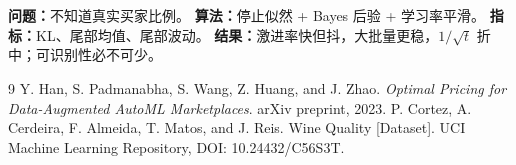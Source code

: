\documentclass[11pt,a4paper]{ctexart}
\begin{document}
\begin{tcolorbox}[colback=LightGreen,colframe=ZJUGreen,title=RQ3,fonttitle=\bfseries]
\textbf{问题：}不知道真实买家比例。\quad
\textbf{算法：}停止似然 + Bayes 后验 + 学习率平滑。\quad
\textbf{指标：}KL、尾部均值、尾部波动。\quad
\textbf{结果：}激进率快但抖，大批量更稳，$1/\sqrt t$ 折中；可识别性必不可少。
\end{tcolorbox}

\begin{thebibliography}{9}
 Y. Han, S. Padmanabha, S. Wang, Z. Huang, and J. Zhao. \textit{Optimal Pricing for Data-Augmented AutoML Marketplaces}. arXiv preprint, 2023.
 P. Cortez, A. Cerdeira, F. Almeida, T. Matos, and J. Reis. Wine Quality [Dataset]. UCI Machine Learning Repository, DOI: 10.24432/C56S3T.
\end{thebibliography}
\end{document}
